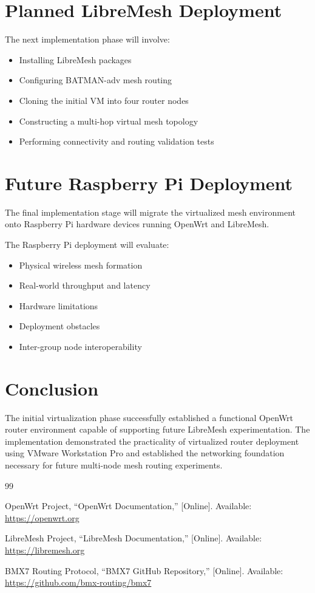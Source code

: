 \documentclass[conference]{IEEEtran}
\begin{document}
\section{Planned LibreMesh Deployment}

The next implementation phase will involve:

\begin{itemize}
    \item Installing LibreMesh packages
    \item Configuring BATMAN-adv mesh routing
    \item Cloning the initial VM into four router nodes
    \item Constructing a multi-hop virtual mesh topology
    \item Performing connectivity and routing validation tests
\end{itemize}

\section{Future Raspberry Pi Deployment}

The final implementation stage will migrate the virtualized mesh environment onto Raspberry Pi hardware devices running OpenWrt and LibreMesh.

The Raspberry Pi deployment will evaluate:

\begin{itemize}
    \item Physical wireless mesh formation
    \item Real-world throughput and latency
    \item Hardware limitations
    \item Deployment obstacles
    \item Inter-group node interoperability
\end{itemize}

\section{Conclusion}

The initial virtualization phase successfully established a functional OpenWrt router environment capable of supporting future LibreMesh experimentation. The implementation demonstrated the practicality of virtualized router deployment using VMware Workstation Pro and established the networking foundation necessary for future multi-node mesh routing experiments.



\begin{thebibliography}{99}

OpenWrt Project, ``OpenWrt Documentation,'' [Online]. Available: \url{https://openwrt.org}

LibreMesh Project, ``LibreMesh Documentation,'' [Online]. Available: \url{https://libremesh.org}

BMX7 Routing Protocol, ``BMX7 GitHub Repository,'' [Online]. Available: \url{https://github.com/bmx-routing/bmx7}

\end{thebibliography}
\end{document}
